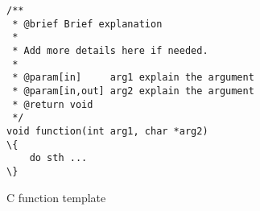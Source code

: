 \begin{figure}[htp]
	
\begin{vcode}
\begin{Verbatim}[frame=single,framesep=2mm,commandchars=\\\{\}]			
/**
 * @brief Brief explanation
 * 
 * Add more details here if needed.
 * 
 * @param[in]     arg1 explain the argument
 * @param[in,out] arg2 explain the argument
 * @return void
 */
void function(int arg1, char *arg2)
\{
    do sth ...
\}
\end{Verbatim}
\end{vcode}

\caption{C function template}
\label{fig:function_template}
\end{figure}